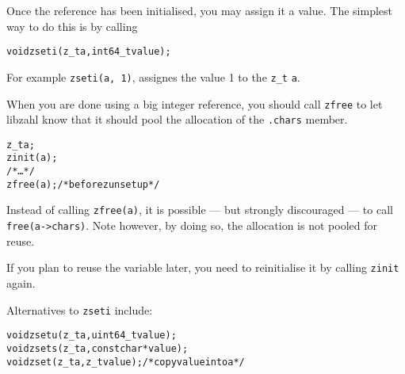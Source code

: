 Once the reference has been initialised, you may assign it
a value. The simplest way to do this is by calling

\begin{alltt}
   void zseti(z_t a, int64_t value);
\end{alltt}

\noindent
For example {\tt zseti(a, 1)}, assignes the value 1 to
the {\tt z\_t} {\tt a}.

When you are done using a big integer reference, you should
call {\tt zfree} to let libzahl know that it should pool
the allocation of the {\tt .chars} member.

\begin{alltt}
   z_t a;
   zinit(a);
   \textcolor{c}{/* \textrm{\ldots} */}
   zfree(a); \textcolor{c}{/* \textrm{before \texttt{zunsetup}} */}
\end{alltt}

\noindent
Instead of calling {\tt zfree(a)}, it is possible — but
strongly discouraged — to call {\tt free(a->chars)}.
Note however, by doing so, the allocation is not pooled
for reuse.

If you plan to reuse the variable later, you need to
reinitialise it by calling {\tt zinit} again.

Alternatives to {\tt zseti} include:

\begin{alltt}
   void zsetu(z_t a, uint64_t value);
   void zsets(z_t a, const char *value);
   void zset(z_t a, z_t value); \textcolor{c}{/* \textrm{copy \texttt{value} into \texttt{a}} */}
\end{alltt}
